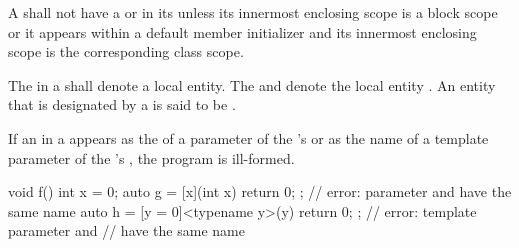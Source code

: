 \pnum
A  shall not have
a  or 
in its 
unless its innermost enclosing scope is a block scope
or it appears within a default member initializer
and its innermost enclosing scope is
the corresponding class scope.

\pnum
The  in a 
shall denote a local entity.
The   and 
denote the local entity .
An entity that is designated by a
is said to be .

\pnum
If an  in a  appears
as the  of a parameter of
the 's 
or as the name of a template parameter of
the 's ,
the program is ill-formed.
\begin{example}
\begin{codeblock}
void f() {
  int x = 0;
  auto g = [x](int x) { return 0; };    // error: parameter and  have the same name
  auto h = [y = 0]<typename y>(y) { return 0; };    // error: template parameter and 
                                                    // have the same name
}
\end{codeblock}
\end{example}


